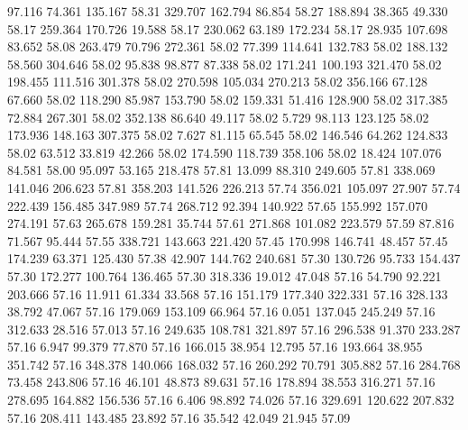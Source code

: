   97.116   74.361  135.167        58.31
 329.707  162.794   86.854        58.27
 188.894   38.365   49.330        58.17
 259.364  170.726   19.588        58.17
 230.062   63.189  172.234        58.17
  28.935  107.698   83.652        58.08
 263.479   70.796  272.361        58.02
  77.399  114.641  132.783        58.02
 188.132   58.560  304.646        58.02
  95.838   98.877   87.338        58.02
 171.241  100.193  321.470        58.02
 198.455  111.516  301.378        58.02
 270.598  105.034  270.213        58.02
 356.166   67.128   67.660        58.02
 118.290   85.987  153.790        58.02
 159.331   51.416  128.900        58.02
 317.385   72.884  267.301        58.02
 352.138   86.640   49.117        58.02
   5.729   98.113  123.125        58.02
 173.936  148.163  307.375        58.02
   7.627   81.115   65.545        58.02
 146.546   64.262  124.833        58.02
  63.512   33.819   42.266        58.02
 174.590  118.739  358.106        58.02
  18.424  107.076   84.581        58.00
  95.097   53.165  218.478        57.81
  13.099   88.310  249.605        57.81
 338.069  141.046  206.623        57.81
 358.203  141.526  226.213        57.74
 356.021  105.097   27.907        57.74
 222.439  156.485  347.989        57.74
 268.712   92.394  140.922        57.65
 155.992  157.070  274.191        57.63
 265.678  159.281   35.744        57.61
 271.868  101.082  223.579        57.59
  87.816   71.567   95.444        57.55
 338.721  143.663  221.420        57.45
 170.998  146.741   48.457        57.45
 174.239   63.371  125.430        57.38
  42.907  144.762  240.681        57.30
 130.726   95.733  154.437        57.30
 172.277  100.764  136.465        57.30
 318.336   19.012   47.048        57.16
  54.790   92.221  203.666        57.16
  11.911   61.334   33.568        57.16
 151.179  177.340  322.331        57.16
 328.133   38.792   47.067        57.16
 179.069  153.109   66.964        57.16
   0.051  137.045  245.249        57.16
 312.633   28.516   57.013        57.16
 249.635  108.781  321.897        57.16
 296.538   91.370  233.287        57.16
   6.947   99.379   77.870        57.16
 166.015   38.954   12.795        57.16
 193.664   38.955  351.742        57.16
 348.378  140.066  168.032        57.16
 260.292   70.791  305.882        57.16
 284.768   73.458  243.806        57.16
  46.101   48.873   89.631        57.16
 178.894   38.553  316.271        57.16
 278.695  164.882  156.536        57.16
   6.406   98.892   74.026        57.16
 329.691  120.622  207.832        57.16
 208.411  143.485   23.892        57.16
  35.542   42.049   21.945        57.09
